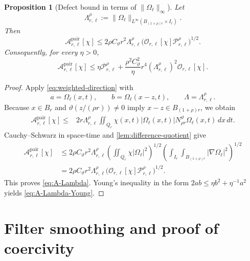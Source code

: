 \documentclass[11pt]{article}
\numberwithin{equation}{section}
\theoremstyle{plain}
\newtheorem{proposition}[theorem]{Proposition}
\theoremstyle{definition}
\theoremstyle{remark}
\begin{document}
\begin{proposition}[Defect bound in terms of $\|\Omega_\ell\|_\infty$]\label{prop:A-Lambda}
Let
\begin{equation}\label{eq:Lambda-def}
\Lambda_{r,\ell}^{\rho}
:=
\|\Omega_\ell\|_{L^\infty(B_{(1+\rho)r}\times I_r)}.
\end{equation}
Then
\begin{equation}\label{eq:A-Lambda}
\mathcal A_{r,\ell}^{\mathrm{pair}}[\chi]
\le
2\rho C_\vartheta r^2\Lambda_{r,\ell}^{\rho}
\bigl(
\mathcal O_{r,\ell}[\chi]
\mathcal P_{r,\ell}^{\rho}
\bigr)^{1/2}.
\end{equation}
Consequently, for every $\eta>0$,
\begin{equation}\label{eq:A-Lambda-Young}
\mathcal A_{r,\ell}^{\mathrm{pair}}[\chi]
\le
\eta\mathcal P_{r,\ell}^{\rho}
+
\frac{\rho^2C_\vartheta^2}{\eta}
r^4(\Lambda_{r,\ell}^{\rho})^2
\mathcal O_{r,\ell}[\chi].
\end{equation}
\end{proposition}

\begin{proof}
Apply \eqref{eq:weighted-direction} with
\[
a=\Omega_\ell(x,t),
\qquad
b=\Omega_\ell(x-z,t),
\qquad
\Lambda=\Lambda_{r,\ell}^{\rho}.
\]
Because $x\in B_r$ and $\vartheta(z/(\rho r))\ne0$ imply $x-z\in B_{(1+\rho)r}$, we obtain
\begin{align}
\mathcal A_{r,\ell}^{\mathrm{pair}}[\chi]
\le{}&
2r\Lambda_{r,\ell}^{\rho}
\iint_{Q_r}
\chi(x,t)|\Omega_\ell(x,t)|
N_{\rho r}^{\vartheta}\Omega_\ell(x,t)
\,dx\,dt.
\label{eq:A-before-Cauchy}
\end{align}
Cauchy--Schwarz in space-time and \cref{lem:difference-quotient} give
\begin{align*}
\mathcal A_{r,\ell}^{\mathrm{pair}}[\chi]
&\le
2\rho C_\vartheta r^2\Lambda_{r,\ell}^{\rho}
\left(\iint_{Q_r}\chi|\Omega_\ell|^2\right)^{1/2}
\left(\int_{I_r}\int_{B_{(1+\rho)r}}|\nabla\Omega_\ell|^2\right)^{1/2}\\
&=
2\rho C_\vartheta r^2\Lambda_{r,\ell}^{\rho}
\bigl(\mathcal O_{r,\ell}[\chi]\mathcal P_{r,\ell}^{\rho}\bigr)^{1/2}.
\end{align*}
This proves \eqref{eq:A-Lambda}. Young's inequality in the form $2ab\le\eta b^2+\eta^{-1}a^2$ yields \eqref{eq:A-Lambda-Young}.
\end{proof}

\section{Filter smoothing and proof of coercivity}\label{sec:coercivity}
\end{document}
